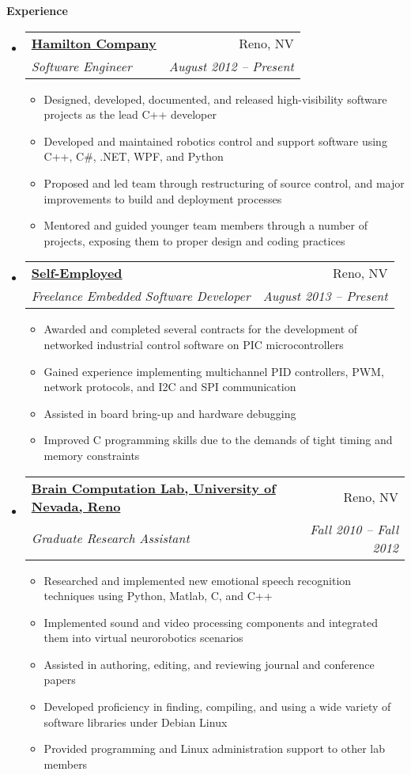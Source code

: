 \documentclass[letterpaper,11pt]{article}
\makeatletter
\newcommand{\resitem}[1]{\item #1 \vspace{-2pt}}
\newcommand{\resheading}[1]{{\large \colorbox{mygrey}{\begin{minipage}{\textwidth}{\textbf{#1 \vphantom{p\^{E}}}}\end{minipage}}}}
\newcommand{\ressubheading}[4]{
\begin{tabular*}{6.5in}{l@{\extracolsep{\fill}}r}
		\textbf{#1} & #2 \\
		\textit{#3} & \textit{#4} \\
\end{tabular*}\vspace{-6pt}}
\makeatother
\begin{document}
\resheading{Experience}
	\begin{itemize}
		\item 
			\ressubheading{\href{http://www.hamiltoncompany.com/}{Hamilton Company}}{Reno, NV}{Software Engineer}{August 2012 -- Present}
				{ \footnotesize
				\begin{itemize}
					\resitem{Designed, developed, documented, and released high-visibility software projects as the lead C++ developer}
					\resitem{Developed and maintained robotics control and support software using C++, C\#, .NET, WPF, and Python}
					\resitem{Proposed and led team through restructuring of source control, and major improvements to build and deployment processes}
					\resitem{Mentored and guided younger team members through a number of projects, exposing them to proper design and coding practices}					
				\end{itemize}
				}		
				
		\item 
			\ressubheading{\href{https://www.linkedin.com/in/gferneyhough}{Self-Employed}}{Reno, NV}{Freelance Embedded Software Developer}{August 2013 -- Present}
				{ \footnotesize
				\begin{itemize}
					\resitem{Awarded and completed several contracts for the development of networked industrial control software on PIC microcontrollers}
					\resitem{Gained experience implementing multichannel PID controllers, PWM, network protocols, and I2C and SPI communication}
					\resitem{Assisted in board bring-up and hardware debugging}
					\resitem{Improved C programming skills due to the demands of tight timing and memory constraints}
				\end{itemize}
				}
				
		\item 
			\ressubheading{\href{http://www.cse.unr.edu/brain/}{Brain Computation Lab, University of Nevada, Reno}}{Reno, NV}{Graduate Research Assistant}{Fall 2010 -- Fall 2012}
				{ \footnotesize
				\begin{itemize}
					\resitem{Researched and implemented new emotional speech recognition techniques using Python, Matlab, C, and C++}
					\resitem{Implemented sound and video processing components and integrated them into virtual neurorobotics scenarios}
					\resitem{Assisted in authoring, editing, and reviewing journal and conference papers}
					\resitem{Developed proficiency in finding, compiling, and using a wide variety of software libraries under Debian Linux}
					\resitem{Provided programming and Linux administration support to other lab members}
				\end{itemize}
				}
	\end{itemize}  %
\end{document}
